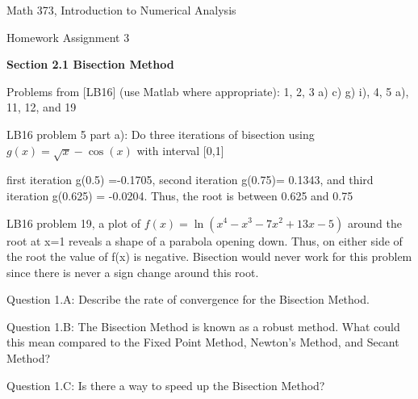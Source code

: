 \documentclass{article}
\renewcommand{\cite}[1]{[#1]}
\def\ds{\displaystyle}
\begin{document}

\large

{\Large Math 373, Introduction to Numerical Analysis}


{\Large Homework Assignment 3} 

\par \bigskip \par



{\bf Section 2.1 Bisection Method} \par \medskip \noindent
Problems from \cite{LB16} (use Matlab where appropriate): 1, 2, 3 a) c) g) i), 4, 5 a), 11, 12, and 19   
\par
{\color{teal}LB16 problem 5 part a): Do three iterations of bisection using $\ds g(x) = \sqrt{x}-\cos(x)$ with interval [0,1]

first iteration g(0.5) =-0.1705, second iteration g(0.75)= 0.1343, and third iteration g(0.625) = -0.0204. Thus, the root is between 0.625 and 0.75 

LB16 problem 19, a plot of $\ds f(x) = \ln(x^4-x^3-7x^2+13x-5)$ around the root at x=1 reveals a shape of a parabola opening down. Thus, on either side of the root the value of f(x) is negative. Bisection would never work for this problem since there is never a sign change around this root. }
\par \medskip \noindent
%
Question 1.A: Describe the rate of convergence for the Bisection Method.   
\medskip \par \noindent
%
Question 1.B: The Bisection Method is known as a robust method. What could this mean compared to the Fixed Point Method, Newton's Method, and Secant Method?
\medskip \par \noindent
%
Question 1.C: Is there a way to speed up the Bisection Method?
\end{document}
